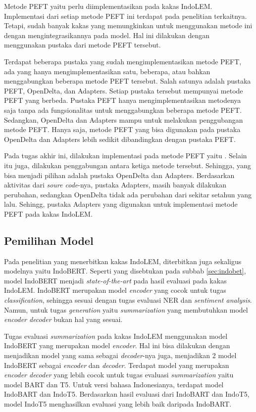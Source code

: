 Metode PEFT yaitu \methodPEFT perlu diimplementasikan pada kakas IndoLEM. Implementasi dari setiap metode PEFT ini terdapat pada penelitian terkaitnya. Tetapi, sudah banyak kakas yang memungkinkan untuk menggunakan metode ini dengan mengintegrasikannya pada model. Hal ini dilakukan dengan menggunakan pustaka dari metode PEFT tersebut.

Terdapat beberapa pustaka yang sudah mengimplementasikan metode PEFT, ada yang hanya mengimplementasikan satu, beberapa, atau bahkan menggabungkan beberapa metode PEFT tersebut. Salah satunya adalah pustaka PEFT, OpenDelta, dan Adapters. Setiap pustaka tersebut mempunyai metode PEFT yang berbeda. Pustaka PEFT hanya mengimplementasikan metodenya saja tanpa ada fungsionalitas untuk menggabungkan beberapa metode PEFT. Sedangkan, OpenDelta dan Adapters mampu untuk melakukan penggubangan metode PEFT. Hanya saja, metode PEFT yang bisa digunakan pada pustaka OpenDelta dan Adapters lebih sedikit dibandingkan dengan pustaka PEFT.

Pada tugas akhir ini,  dilakukan implementasi pada metode PEFT yaitu \methodPEFT. Selain itu juga, dilakukan penggabungan antara ketiga metode tersebut. Sehingga, yang bisa menjadi pilihan adalah pustaka OpenDelta dan Adapters. Berdasarkan aktivitas dari \textit{soure code}-nya, pustaka Adapters, masih banyak dilakukan perubahan, sedangkan OpenDelta tidak ada perubahan dari sekitar setahun yang lalu. Sehingg, pustaka Adapters yang  digunakan untuk implementasi metode PEFT pada kakas IndoLEM.

\subsection{Pemilihan Model}

Pada penelitian yang menerbitkan kakas IndoLEM, diterbitkan juga sekaligus modelnya yaitu IndoBERT. Seperti yang disebtukan pada subbab \ref{sec:indobet}, model IndoBERT menjadi \textit{state-of-the-art} pada hasil evaluasi pada kakas IndoLEM. IndoBERT merupakan model \textit{encoder} yang cocok untuk tugas \textit{classification}, sehingga sesuai dengan tugas evaluasi NER dan \textit{sentiment analysis}. Namun, untuk tugas \textit{generation} yaitu \textit{summarization} yang membutuhkan model \textit{encoder decoder} bukan hal yang sesuai.

Tugas evaluasi \textit{summarization} pada kakas IndoLEM menggunakan model IndoBERT yang merupakan model \textit{encoder}. Hal ini bisa dilakukan dengan menjadikan model yang sama sebagai \textit{decoder}-nya juga, menjadikan 2 model IndoBERT sebagai \textit{encoder} dan \textit{decoder}. Terdapat model yang merupakan \textit{encoder decoder} yang lebih cocok untuk tugas evaluasi \textit{summarization} yaitu model BART dan T5. Untuk versi bahasa Indonesianya, terdapat model IndoBART dan IndoT5. Berdasarkan hasil evaluasi dari IndoBART dan IndoT5, model IndoT5 menghasilkan evaluasi yang lebih baik daripada IndoBART. 

